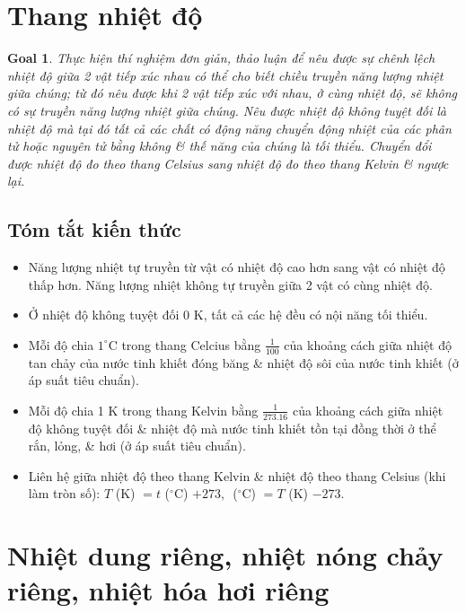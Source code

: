 \documentclass{article}
\newtheorem{goal}{Goal}
\begin{document}

\section{Thang nhiệt độ}

\begin{goal}
	Thực hiện thí nghiệm đơn giản, thảo luận để nêu được sự chênh lệch nhiệt độ giữa 2 vật tiếp xúc nhau có thể cho biết chiều truyền năng lượng nhiệt giữa chúng; từ đó nêu được khi 2 vật tiếp xúc với nhau, ở cùng nhiệt độ, sẽ không có sự truyền năng lượng nhiệt giữa chúng. Nêu được nhiệt độ không tuyệt đối là nhiệt độ mà tại đó tất cả các chất có động năng chuyển động nhiệt của các phân tử hoặc nguyên tử bằng không \& thế năng của chúng là tối thiểu. Chuyển đổi được nhiệt độ đo theo thang Celsius sang nhiệt độ đo theo thang Kelvin \& ngược lại.
\end{goal}

\subsection{Tóm tắt kiến thức}

\begin{itemize}
	\item Năng lượng nhiệt tự truyền từ vật có nhiệt độ cao hơn sang vật có nhiệt độ thấp hơn. Năng lượng nhiệt không tự truyền giữa 2 vật có cùng nhiệt độ.
	\item Ở nhiệt độ không tuyệt đối 0 K, tất cả các hệ đều có nội năng tối thiểu.
	\item Mỗi độ chia $1^\circ$C trong thang Celcius bằng $\frac{1}{100}$ của khoảng cách giữa nhiệt độ tan chảy của nước tinh khiết đóng băng \& nhiệt độ sôi của nước tinh khiết (ở áp suất tiêu chuẩn).
	\item Mỗi độ chia 1 K trong thang Kelvin bằng $\frac{1}{273.16}$ của khoảng cách giữa nhiệt độ không tuyệt đối \& nhiệt độ mà nước tinh khiết tồn tại đồng thời ở thể rắn, lỏng, \& hơi (ở áp suất tiêu chuẩn).
	\item Liên hệ giữa nhiệt độ theo thang Kelvin \& nhiệt độ theo thang Celsius (khi làm tròn số): $T$ (K) $= t$ (${}^\circ$C) $+ 273$, $ $ (${}^\circ$C) $= T$ (K) $- 273$.
\end{itemize}


\section{Nhiệt dung riêng, nhiệt nóng chảy riêng, nhiệt hóa hơi riêng}
\end{document}
